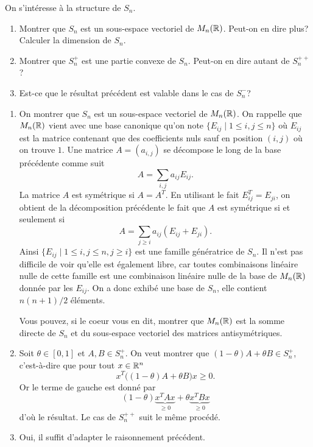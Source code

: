 \documentclass[11pt, a4paper]{article}
\begin{document}
\begin{question}
  On s'intéresse à la structure de $S_n$. 
  \begin{enumerate}
  \item Montrer que $S_n$ est un sous-espace vectoriel de
    $M_n(\mathbb{R})$. Peut-on en dire plus? Calculer la dimension de $S_n$.
  \item Montrer que $S_n^{+}$ est une partie convexe de
    $S_n$. Peut-on en dire autant de $S_n^{++}$? 
  \item Est-ce que le résultat précédent est valable dans le cas de
    $S_n^{-}$?
  \end{enumerate}
\end{question}

\begin{solution}
  \begin{enumerate}
  \item On montrer que $S_n$ est un sous-espace vectoriel de
    $M_n(\mathbb{R})$. On rappelle que $M_n(\mathbb{R})$ vient avec une base canonique
    qu'on note $\{E_{ij}\mid 1 \leq i, j \leq n\}$ où $E_{ij}$ est la
    matrice contenant que des coefficients nuls sauf en position
    $(i,j)$ où on trouve $1$. Une matrice $A = (a_{i, j})$ se
    décompose le long de la base précédente comme suit
    \[
    A = \sum_{i, j} a_{ij}E_{ij}.
    \]
    La matrice $A$ est symétrique si $A = A^T$. En utilisant le fait
    $E_{ij}^T = E_{ji}$, on obtient de la décomposition précédente le
    fait que $A$ est symétrique si et seulement si
    \[
    A = \sum_{j \geq i} a_{ij}\left(E_{ij} + E_{ji}\right).
    \]
    Ainsi $\{E_{ij}\mid 1 \leq i, j \leq n, j \geq i\}$ est une
    famille génératrice de $S_n$. Il n'est pas difficile de voir
    qu'elle est également libre, car toutes combinaisons linéaire
    nulle de cette famille est une combinaison linéaire nulle de la
    base de $M_n(\mathbb{R})$ donnée par les $E_{ij}$. On a donc exhibé une
    base de $S_n$, elle contient $n(n+1)/2$ éléments. 

    Vous pouvez, si le coeur vous en dit, montrer que $M_n(\mathbb{R})$ est la
    somme directe de $S_n$ et du sous-espace vectoriel des matrices
    antisymétriques.
  \item Soit $\theta \in [0, 1]$ et $A, B \in S_n^+$. On veut montrer
    que $(1-\theta)A + \theta B \in S_n^+$, c'est-à-dire que pour tout
    $x \in \mathbb{R}^n$
    \[
    x^T\big((1-\theta)A + \theta B\big)x \geq 0.
    \]
    Or le terme de gauche est donné par
    \[
    (1-\theta)\underbrace{x^TAx}_{\geq 0} + \theta\underbrace{x^TBx}_{\geq 0}
    \]
    d'où le résultat. Le cas de $S_n^{++}$ suit le même procédé.  
  \item Oui, il suffit d'adapter le raisonnement précédent. 
  \end{enumerate}
\end{solution}
\end{document}
